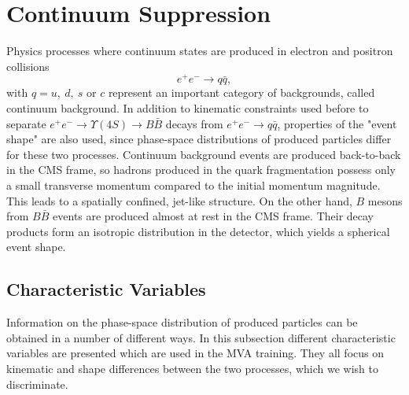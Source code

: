 \section{Continuum Suppression}

Physics processes where continuum states are produced in electron and positron collisions $$e^+ e^- \to q \bar q,$$ 
with $q = u,~d,~s$ or $c$ represent an important category of backgrounds, called continuum background. In addition to kinematic constraints used before to separate $e^+ e^- \to \Upsilon(4S) \to B \bar B$ decays from $e^+ e^- \to q \bar q$, properties of the "event shape" are also used, since phase-space distributions of produced particles differ for these two processes. Continuum background events are produced back-to-back in the CMS frame, so hadrons produced in the quark fragmentation possess only a small transverse momentum compared to the initial momentum magnitude. This leads to a spatially confined, jet-like structure. On the other hand, $B$ mesons from $B \bar B$ events are produced almost at rest in the CMS frame. Their decay products form an isotropic distribution in the detector, which yields a spherical event shape.

\subsection{Characteristic Variables}
\label{ss:charvar}
Information on the phase-space distribution of produced particles can be obtained in a number of different ways. In this subsection different characteristic variables are presented which are used in the MVA training. They all focus on kinematic and shape differences between the two processes, which we wish to discriminate. 


